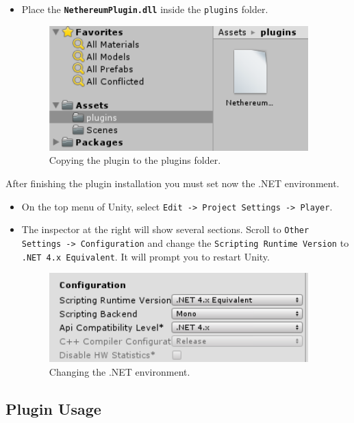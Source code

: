\documentclass[a4paper, 11pt, titlepage]{article}
\begin{document}
\begin{enumerate}
\begin{itemize}
\item Place the \textbf{\texttt{NethereumPlugin.dll}} inside the \texttt{plugins} folder.

\begin{figure}[htbp]
\centering
\includegraphics[width=10cm]{./docs/image6.png}
\caption{\label{fig:org6ad36b0}
Copying the plugin to the plugins folder.}
\end{figure}
\end{itemize}
\end{enumerate}

After finishing the plugin installation you must set now the .NET environment.

\begin{itemize}
\item On the top menu of Unity, select \texttt{Edit -> Project Settings -> Player}.
\item The inspector at the right will show several sections. Scroll to \texttt{Other Settings -> Configuration} and change the \texttt{Scripting Runtime Version} to \texttt{.NET 4.x Equivalent}. It will prompt you to restart Unity.

\begin{figure}[htbp]
\centering
\includegraphics[width=10cm]{./docs/image2.png}
\caption{\label{fig:org43199fe}
Changing the .NET environment.}
\end{figure}
\end{itemize}

\subsection{Plugin Usage}
\label{sec:orgb818338}
\end{document}
